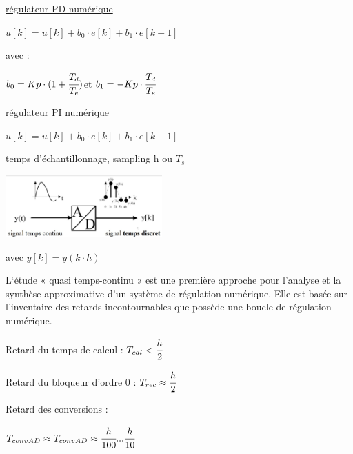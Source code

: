 
\hformbar



\underline{régulateur PD numérique}
\vspace{3mm}

$u[k] = u[k] + b_0 \cdot e[k]+ b_1 \cdot e[k-1]$ 

avec :


\hfill $b_0 = Kp\cdot(1+\cfrac{T_d}{T_e})$\hfill et \hfill $b_1 = -Kp \cdot \cfrac{T_d}{T_e}$ \hfill

\vspace{3mm}

\underline{régulateur PI numérique}
\vspace{3mm}

$u[k] = u[k] + b_0 \cdot e[k]+ b_1 \cdot e[k-1]$ 

\hformbar



temps d'échantillonnage, sampling h ou $T_s$ 

\includegraphics[width = 0.45\textwidth]{img/echantillonage.JPG}
\begin{center}
    avec $y[k] = y(k \cdot h)$
\end{center}




L‘étude « quasi temps-continu » est une première approche pour 
l’analyse et la synthèse approximative d’un système de régulation 
numérique.
Elle est basée sur l’inventaire des retards incontournables que 
possède une boucle de régulation numérique.

Retard du temps de calcul : $T_{cal} < \cfrac{h}{2}$

Retard du bloqueur d'ordre 0 : $T_{rec} \approx \cfrac{h}{2}$

\vspace{3mm}

Retard des conversions :

$T_{convAD} \approx T_{convAD} \approx \cfrac{h}{100} ... \cfrac{h}{10} $


\vspace{2mm}


